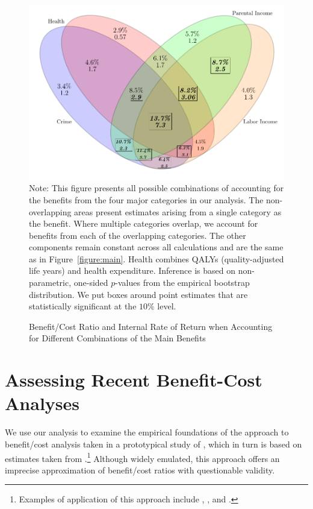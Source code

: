 \begin{figure}[htpb!]
\caption{Benefit/Cost Ratio and Internal Rate of Return when Accounting for Different Combinations of the Main Benefits}\label{figure:vennpooled}
\centering
\includegraphics[width=.7\columnwidth]{output/venn_pooled.pdf}
\footnotesize \justify
Note: This figure presents all possible combinations of accounting for the benefits from the four major categories in our analysis. The non-overlapping areas present estimates arising from a single category as the benefit. Where multiple categories overlap, we account for benefits from each of the overlapping categories. The other components remain constant across all calculations and are the same as in Figure~\ref{figure:main}. Health combines QALYs (quality-adjusted life years) and health expenditure. Inference is based on non-parametric, one-sided $p$-values from the empirical bootstrap distribution. We put boxes around point estimates that are statistically significant at the $10\%$ level.
\end{figure}

\section{Assessing Recent Benefit-Cost Analyses} \label{section:bcaestimates}

\noindent We use our analysis to examine the empirical foundations of the approach to benefit/cost analysis taken in a prototypical study of \citet{Kline_Walters_2016_QJE}, which in turn is based on estimates taken from \citet{Chetty_Friedman_etal_2011_QJoE}.\footnote{Examples of application of this approach include \citet{Attanasio_Kugler_Meghir_2011_AEJAE}, \cite{Behrman-et-al_2011_JHR-Progresa}, and \cite{Lafortune_etal_2018_Reform_AEJAE}.} Although widely emulated, this approach offers an imprecise approximation of benefit/cost ratios with questionable validity.

